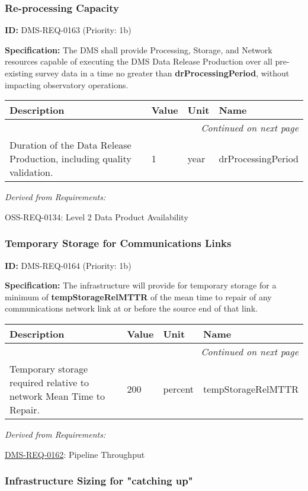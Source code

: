 \documentclass[SE,toc,lsstdraft]{lsstdoc}
\makeatletter
\newcommand{\paramname}[1]{\hspace{0pt}#1}
\newcommand{\unitname}[1]{\hspace{0pt}#1}
\newenvironment{parameters}[0]{%
\setlength\LTleft{0pt}
\setlength\LTright{\fill}
\begin{small}
\begin{longtable}[]{|p{0.49\textwidth}|l|p{0.6in}|p{1.70in}@{}|}

\hline \textbf{Description} & \textbf{Value} & \textbf{Unit} & \textbf{Name} \\ \hline
\endhead

\hline \multicolumn{4}{r}{\emph{Continued on next page}} \\
\endfoot

\hline\hline
\endlastfoot
}{%
\hline
\end{longtable}
\end{small}
}
\makeatother
\begin{document}
\subsubsection{Re-processing Capacity}

\label{DMS-REQ-0163}
\textbf{ID:} DMS-REQ-0163 (Priority: 1b)

\textbf{Specification:} The DMS shall provide Processing, Storage, and Network resources capable of executing the DMS Data Release Production over all pre-existing survey data in a time no greater than \textbf{drProcessingPeriod}, without impacting observatory operations.

\begin{parameters}
Duration of the Data Release Production, including quality validation.
&
1
&
\unitname{%
year
}
&
\paramname{%
drProcessingPeriod
} \\\hline
\end{parameters}

\emph{Derived from Requirements:}

OSS-REQ-0134:
Level 2 Data Product Availability \newline

\subsubsection{Temporary Storage for Communications Links}

\label{DMS-REQ-0164}
\textbf{ID:} DMS-REQ-0164 (Priority: 1b)

    \textbf{Specification: }The infrastructure will provide for temporary storage for a minimum of \textbf{tempStorageRelMTTR} of the mean time to repair of any communications network link at or before the source end of that link.

\begin{parameters}
Temporary storage required relative to network Mean Time to Repair.
&
200
&
\unitname{%
percent
}
&
\paramname{%
tempStorageRelMTTR
} \\\hline
\end{parameters}

\emph{Derived from Requirements:}

\hyperref[DMS-REQ-0162]{DMS-REQ-0162}:
Pipeline Throughput \newline

\subsubsection{Infrastructure Sizing for "catching up"}
\end{document}
